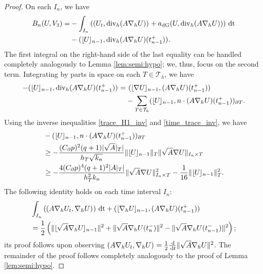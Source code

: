 \documentclass{amsart}
\newcommand{\norm}[2]{\|{#1}\|_{{#2}}}
\newcommand{\ud}{\,{\rm d}}
\newcommand{\tjump}[1]{\lfloor\kern-0.4mm{#1}\kern-0.4mm\rfloor}
\newcommand{\su}{\sum_{T \in \Th}}
\newcommand{\inner}[3]{({#1},{#2})_{{#3}}}
\newcommand{\Th}{\mathcal{T}_h}
\newcommand{\Div}{{\rm div}}
\newcommand{\cinvT}{C_{\partial}}
\newcommand{\normal}{{n}}
\newcommand{\dt}{\,{\rm dt}}
\theoremstyle{definition}
\theoremstyle{remark}
\numberwithin{equation}{section}
\begin{document}
\begin{proof}
On each $I_n$, we have
\begin{equation*}\begin{split}
		B_n(U,V_3)
		=&
		-\int_{I_n} \left(
		\inner{U_t}{ \Div_h ( A \nabla_h U)}{}
		+
		a_{\rm dG}(U, \Div_h ( A \nabla_h U))
		\right) \dt
		\\
		&
		- \inner{\tjump{U}_{n-1}}{\Div_h ( A \nabla_h U)( t_{n-1}^+)}{}.
\end{split}\end{equation*}
The first integral on the right-hand side of the last equality can be handled completely analogously to Lemma \ref{lem:semi:hypo}; we, thus, focus on the second term. Integrating by parts in space on each $T\in \Th$, we have
\begin{equation*}
	\begin{split}
		- \inner{\tjump{U}_{n-1}}{\Div_h ( A \nabla_h U)( t_{n-1}^+)}{}
		=&\
		\inner{\tjump{\nabla U}_{n-1}}{ ( A \nabla_h U)( t_{n-1}^+)}{} \\
		&   - \su \inner{\tjump{U}_{n-1}}{\normal \cdot ( A \nabla_h U)( t_{n-1}^+)}{\partial T}.
	\end{split}
\end{equation*}
Using the inverse inequalities \eqref{trace_H1_inv} and \eqref{time_trace_inv},  we have
\begin{equation}\label{eq: relation 1}
	\begin{split}
		& - \inner{\tjump{U}_{n-1}}{\normal \cdot ( A \nabla_h U)( t_{n-1}^+)}{\partial T}
		\\
		& \geq
		-  \frac{(\cinvT p)^2 (q+1)|\sqrt{A}|_T|}{h_T \sqrt{k_n}} \norm{\tjump{U}_{n-1}}{T} \norm{ \sqrt{A} \nabla U}{I_n\times T}  \\
		& \geq
		-   \frac{4 (\cinvT p)^4(q+1)^2|A|_T|}{h_T^2 k_n} \norm{ \sqrt{A} \nabla U}{I_n\times T}^2
		- \frac{1}{16} \norm{\tjump{U}_{n-1}}{T}^2.
\end{split}\end{equation}
The following identity holds on each time interval $I_n$:
\begin{equation}\label{eq: relation 2}
	\begin{split}
		&  \int_{I_n} \left( \inner{A \nabla_h U_t}{  \nabla_h U}{} \right) \dt
		+ \inner{\tjump{\nabla_h U}_{n-1}}{ ( A \nabla_h U)( t_{n-1}^+)}{}
		\\
		&= \frac{1}{2}\left( \norm{\tjump{\sqrt{A}\nabla_h U}_{n-1}}{}^2
		+	\norm{\sqrt{A}\nabla_h U(t_n^-)}{}^2 -	\norm{\sqrt{A}\nabla_h U(t_{n-1}^-)}{}^2   \right);
\end{split}\end{equation}
its proof follows upon observing $ \inner{A \nabla_h U_t}{  \nabla_h U}{}=\frac{1}{2} \frac{\ud}{\ud t}\norm{\sqrt{A}\nabla_h U}{}^2$.
The remainder of the proof follows completely analogously to the proof of Lemma \ref{lem:semi:hypo}.
\end{proof}
\end{document}

